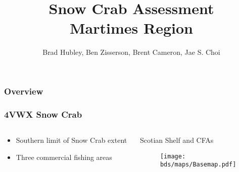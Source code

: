\documentclass{beamer}
\title[Snow Crab Assessment \yr]{Snow Crab Assessment\\  Martimes Region\\ \yr }
\author[Hubley, Zisserson, Cameron, Choi]{Brad Hubley, Ben Zisserson, Brent Cameron, Jae S. Choi}
\institute[DFO Science]{
  Department of Fisheries and Oceans \\ %
  Science Branch \\
  Population Ecology Division
  \medskip
  \textit{} %
}
\numberwithin{equation}{section}		%
\numberwithin{figure}{section}	   	%
\numberwithin{table}{section}				%
\newcommand{\bd}{\string~/bio.data}   %
\newcommand{\bds}{\bd/bio.snowcrab}
\begin{document}
  \begin{frame}
    \titlepage %
  \end{frame}
  

  \begin{frame}
    \frametitle{Overview} %
    \tableofcontents %
  \end{frame}
  
  
  \begin{frame}
    \frametitle{4VWX Snow Crab}
    \begin{columns}[T]
      \begin{column}{0.4\textwidth}
        \begin{itemize}
          \item Southern limit of Snow Crab extent
          \item Three commercial fishing areas
        \end{itemize}
      \end{column}
      
      \begin{column}{0.6\textwidth}
        \begin{centering}
          Scotian Shelf and CFAs
          \begin{figure}
            \texttt{[image: \\bds/maps/Basemap.pdf]}
          \end{figure}
        \end{centering}
      \end{column}
    \end{columns}
  \end{frame}
  
  
\end{document}
